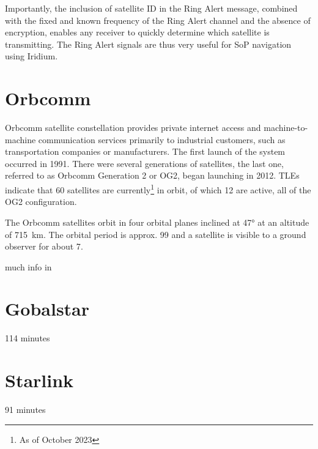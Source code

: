 Importantly, the inclusion of satellite ID in the Ring Alert message, combined with the fixed and known frequency of the Ring Alert channel and the absence of encryption, enables any receiver to quickly determine which satellite is transmitting. The Ring Alert signals are thus very useful for SoP navigation using Iridium.


\section{Orbcomm}
Orbcomm satellite constellation provides private internet access and machine-to-machine communication services primarily to industrial customers, such as transportation companies or manufacturers. The first launch of the system occurred in 1991. There were several generations of satellites, the last one, referred to as Orbcomm Generation 2 or OG2, began launching in 2012. TLEs indicate that 60 satellites are currently\footnote{As of October 2023} in orbit, of which 12 are active, all of the OG2 configuration\cite{sat12}.

The Orbcomm satellites orbit in four orbital planes inclined at \ang{47} at an altitude of \qty{715}{km}. The orbital period is approx. \qty{99}{\min} and a satellite is visible to a ground observer for about \qty{7}{\min}\cite{sat11}\cite{sop08}.

much info in \cite{sop08}


\section{Gobalstar}
114 minutes

\section{Starlink}
91 minutes